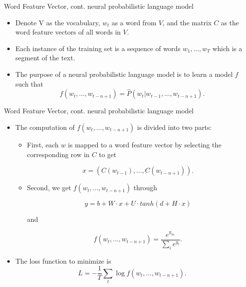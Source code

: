 \documentclass{beamer}
\begin{document}
\begin{frame}{Word Feature Vector, cont.}
    neural probabilistic language model
    \begin{itemize}
        \item Denote V as the vocabulary, $w_t$ as a word from $V$, and the matrix $C$ as the word feature vectors of all words in $V$.
        \item Each instance of the training set is a sequence of words $w_1,...,w_T$ which is a segment of the text.
        \item The purpose of a neural probabilistic language model is to learn a model $f$ such that
        $$ f(w_t, ..., w_{t-n+1}) = \hat{P}(w_t | w_{t-1},...,w_{t-n+1}).$$

    \end{itemize}
\end{frame}

\begin{frame}{Word Feature Vector, cont.}
    neural probabilistic language model
    \begin{itemize}
        \item The computation of $f(w_t, ..., w_{t-n+1})$ is divided into two parts:
            \begin{itemize}
                \item First, each $w$ is mapped to a word feature vector by selecting the corresponding row in $C$ to get

                $$x=(C(w_{t-1}),... ,C(w_{t-n+1})).$$

                \item Second, we get $f(w_t, ..., w_{t-n+1})$ through

                $$y=b+W\cdot x + U\cdot tanh(d + H\cdot x)$$

                and

                $$ f(w_t, ..., w_{t-n+1}) = \frac{e^{y_{w_t}}}{\sum_{i}^{}e^{y_i}}.$$
            \end{itemize}
        \item The loss function to minimize is $$L = -\frac{1}{T}\sum _{t}^{} \log{f(w_t, ..., w_{t-n+1})}.$$
    \end{itemize}
\end{frame}
\end{document}
